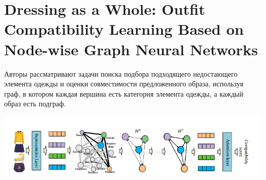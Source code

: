 \documentclass[a4paper,12pt]{article}
\begin{document}
\section{Dressing as a Whole: Outfit Compatibility Learning Based on Node-wise Graph Neural Networks}
Авторы рассматривают задачи поиска подбора подходящего недостающего элемента одежды и оценки совместимости предложенного образа, используя граф, в котором каждая вершина есть категория элемента одежды, а каждый образ есть подграф. 

\includegraphics[scale = 0.87]{Dressing as a whole intro.png}\\
\end{document}
